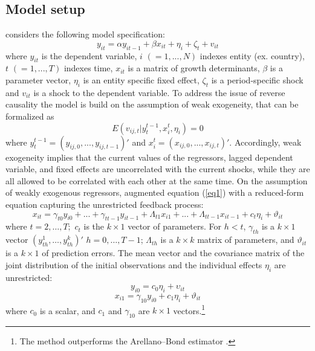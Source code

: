 \documentclass[a4paper]{article}
\begin{document}
\subsection{Model setup}
\noindent \citet{Moral+2016} considers the following model specification:
\begin{equation}\label{eq1}
    y_{it}=\alpha y_{it-1}+\beta x_{it}+\eta_{i}+\zeta_{t}+v_{it}
\end{equation}
\noindent where $y_{it}$ is the dependent variable, $i$ $(=1,...,N)$ indexes entity (ex. country), $t$ $(=1,...,T)$ indexes time, $x_{it}$ is a matrix of growth determinants, $\beta$ is a parameter vector, $\eta_{i}$ is an entity specific fixed effect, $\zeta_{t}$ is a period-specific shock and $v_{it}$ is a shock to the dependent variable. To address the issue of reverse causality the model is build on the assumption of weak exogeneity, that can be formalized as
\begin{equation}\label{eq2}
    E(v_{ij,t}|y^{t-1}_{t},x^{t}_{i},\eta_{i})=0
\end{equation}
\noindent where $y^{t-1}_{t}=(y_{ij,0},...,y_{ij,t-1})'$ and $x^t_{i}=(x_{ij,0},...,x_{ij,t})'$. Accordingly, weak exogeneity implies that the current values of the regressors, lagged dependent variable, and fixed effects are uncorrelated with the current shocks, while they are all allowed to be correlated with each other at the same time. On the assumption of weakly exogenous regressors, \citet{Moral+2013} augmented equation (\ref{eq1}) with a reduced-form equation capturing the unrestricted feedback process:
\begin{equation}\label{eq3}
x_{it}=\gamma_{t0}y_{i0}+...+\gamma_{tt-1}y_{it-1}+\Lambda_{t1}x_{i1}+...+\Lambda_{tt-1}x_{it-1}+c_{t}\eta_{i}+\vartheta_{it}
\end{equation}
\noindent where $t=2,\dots ,T;$ $c_{t}$ is the $k\times 1$ vector of parameters. For $h<t$, $\gamma_{th}$ is a $k\times 1$ vector $(y_{th}^{1},\dots,y_{th}^{k})'$  $h=0,\dots,T-1$; $\Lambda_{th}$ is a $k\times k$ matrix of parameters, and $\vartheta_{it}$ is a $k\times 1$ of prediction errors. The mean vector and the covariance matrix of the joint distribution of the initial observations and the individual effects $\eta_{i}$ are unrestricted:
\begin{equation}\label{eq4}
    y_{i0}=c_{0}\eta_{i}+\upsilon_{it}
\end{equation}
\begin{equation}\label{eq5}
    x_{i1}=\gamma_{10}y_{i0}+c_{1}\eta_{i}+\vartheta_{it}
\end{equation}
\noindent where $c_{0}$ is a scalar, and $c_{1}$ and $\gamma_{10}$ are $k\times 1$ vectors.\footnote{The method outperforms the Arellano--Bond estimator \citep{Moral+2019}.}
\end{document}
